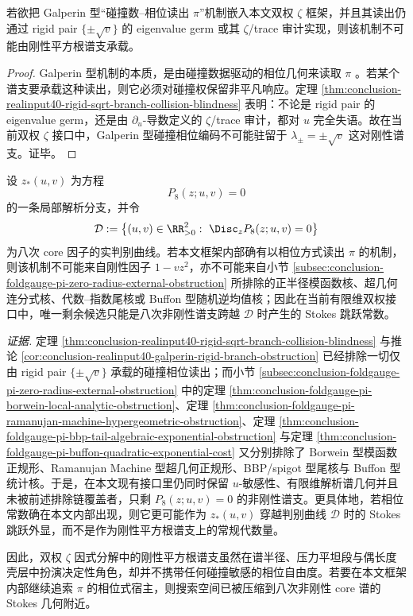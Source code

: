 \begin{corollary}\label{cor:conclusion-realinput40-galperin-rigid-branch-obstruction}
若欲把 Galperin 型“碰撞数--相位读出 \(\pi\)”机制嵌入本文双权 \(\zeta\) 框架，并且其读出仍通过 rigid pair \(\{\pm\sqrt v\}\) 的 eigenvalue germ 或其 \(\zeta\)/trace 审计实现，则该机制不可能由刚性平方根谱支承载。
\end{corollary}
\begin{proof}
Galperin 型机制的本质，是由碰撞数据驱动的相位几何来读取 \(\pi\) \cite{AretxabaletaEtAl2020GalperinDigitsPi}。若某个谱支要承载这种读出，则它必须对碰撞权保留非平凡响应。定理 \ref{thm:conclusion-realinput40-rigid-sqrt-branch-collision-blindness} 表明：不论是 rigid pair 的 eigenvalue germ，还是由 \(\partial_u\)-导数定义的 \(\zeta\)/trace 审计，都对 \(u\) 完全失语。故在当前双权 \(\zeta\) 接口中，Galperin 型碰撞相位编码不可能驻留于 \(\lambda_\pm=\pm\sqrt v\) 这对刚性谱支。证毕。
\end{proof}

\begin{conjecture}\label{conj:conclusion-realinput40-nonrigid-stokes-only-host}
设 \(z_\ast(u,v)\) 为方程
\[
P_8(z;u,v)=0
\]
的一条局部解析分支，并令
\[
\mathcal D
:=
\bigl\{(u,v)\in\RR_{>0}^2:\ \Disc_z P_8(z;u,v)=0\bigr\}
\]
为八次 core 因子的实判别曲线。若本文框架内部确有以相位方式读出 \(\pi\) 的机制，则该机制不可能来自刚性因子 \(1-vz^2\)，亦不可能来自小节 \ref{subsec:conclusion-foldgauge-pi-zero-radius-external-obstruction} 所排除的正半径模函数核、超几何连分式核、代数--指数尾核或 Buffon 型随机逆均值核；因此在当前有限维双权接口中，唯一剩余候选只能是八次非刚性谱支跨越 \(\mathcal D\) 时产生的 Stokes 跳跃常数。
\end{conjecture}

\noindent\emph{证据.}
定理 \ref{thm:conclusion-realinput40-rigid-sqrt-branch-collision-blindness} 与推论 \ref{cor:conclusion-realinput40-galperin-rigid-branch-obstruction} 已经排除一切仅由 rigid pair \(\{\pm\sqrt v\}\) 承载的碰撞相位读出；而小节 \ref{subsec:conclusion-foldgauge-pi-zero-radius-external-obstruction} 中的定理 \ref{thm:conclusion-foldgauge-pi-borwein-local-analytic-obstruction}、定理 \ref{thm:conclusion-foldgauge-pi-ramanujan-machine-hypergeometric-obstruction}、定理 \ref{thm:conclusion-foldgauge-pi-bbp-tail-algebraic-exponential-obstruction} 与定理 \ref{thm:conclusion-foldgauge-pi-buffon-quadratic-exponential-cost} 又分别排除了 Borwein 型模函数正规形、Ramanujan Machine 型超几何正规形、BBP/spigot 型尾核与 Buffon 型统计核。于是，在本文现有接口里仍同时保留 \(u\)-敏感性、有限维解析谱几何并且未被前述排除链覆盖者，只剩 \(P_8(z;u,v)=0\) 的非刚性谱支。更具体地，若相位常数确在本文内部出现，则它更可能作为 \(z_\ast(u,v)\) 穿越判别曲线 \(\mathcal D\) 时的 Stokes 跳跃外显，而不是作为刚性平方根谱支上的常规代数量。

\noindent
因此，双权 \(\zeta\) 因式分解中的刚性平方根谱支虽然在谱半径、压力平坦段与偶长度壳层中扮演决定性角色，却并不携带任何碰撞敏感的相位自由度。若要在本文框架内部继续追索 \(\pi\) 的相位式宿主，则搜索空间已被压缩到八次非刚性 core 谱的 Stokes 几何附近。

\endinput
